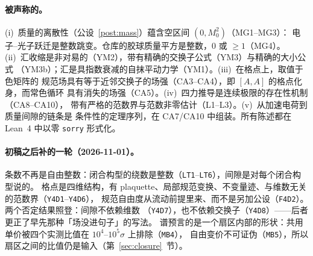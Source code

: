 \documentclass[aps,prd,preprint,superscriptaddress,amsmath,amssymb]{revtex4-2}
\begin{document}
\paragraph{被声称的。}
(i)~质量的离散性（公设~\ref{post:mass}）蕴含空区间 $(0,M_0^2)$（MG1--MG3）：
电子--光子跃迁是整数跳变。仓库的胶球质量平方是整数，$0$ 或 $\ge1$（MG4）。
(ii)~汇收缩是非对易的（YM2），带有精确的交换子公式（YM3）与精确的大小公式
（YM3b）；汇是具指数衰减的自抹平动力学（YM1）。(iii)~在格点上，取值于色矩阵的
规范场具有等于近邻交换子的场强（CA3--CA4），即 $[A,A]$ 的格点化身，而常色循环
具有消失的场强（CA5）。(iv)~四力推导是连续极限的存在性机制（CA8--CA10），
带有严格的范数界与范数非零估计（L1--L3）。(v)~从加速电荷到质量间隙的链条是
条件性的定理序列，在 CA7/CA10 中组装。所有陈述都在 Lean~4 中以零 \texttt{sorry}
形式化。

\paragraph{初稿之后补的一轮（2026-11-01）。}
条数不再是自由整数：闭合构型的绕数是整数（\texttt{LT1}--\texttt{LT6}），间隙是对每个闭合构型说的。
格点是四维结构，有 plaquette、局部规范变换、不变量迹、与维数无关的范数界（\texttt{Y4D1}--\texttt{Y4D6}），
规范自由度从流动前提里来、而不是另加公设（\texttt{F4D2}）。两个否定结果照登：间隙不依赖维数
（\texttt{Y4D7}），也不依赖交换子（\texttt{Y4D8}）——后者更正了早先那种「场没进句子」的写法。
谱预言的是一个扇区内部的形状：共用单价被四个实测比值在 $10^4$--$10^5\sigma$ 上排除（\texttt{MB4}），
自由变价不可证伪（\texttt{MB5}），所以扇区之间的比值仍是输入（第~\ref{sec:closure}~节）。
\end{document}

